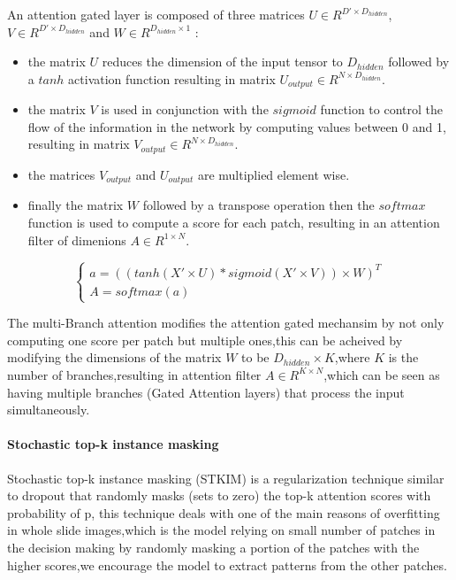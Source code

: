 \documentclass[
11pt, %
english, %
singlespacing, %
headsepline, %
]{project_structure}
\newcommand{\subpar}[1]{\paragraph*{#1}}
\begin{document}
\noindent An attention gated layer is composed of three matrices $U \in R^{D' \times D_{hidden}}$,$V \in R^{D' \times D_{hidden}} $ and $W \in R^{D_{hidden} \times 1}$ : 

\begin{itemize}
    \item the matrix $U$ reduces the dimension of the input tensor to $D_{hidden}$ followed by a $tanh$ activation function resulting in matrix $U_{output} \in R^{N \times D_{hidden}}$.
    \item the matrix $V$ is used in conjunction with the $sigmoid$ function to control the flow of the information in the network by computing values between 0 and 1, resulting in matrix $V_{output} \in R^{N \times D_{hidden}}$.
    \item the matrices $V_{output}$ and $U_{output}$ are multiplied element wise.
    \item finally the matrix $W$ followed by a transpose operation then the $softmax$ function is used to compute a score for each patch, resulting in an attention filter of dimenions $A \in R^{1 \times N}$.
\end{itemize}

$$
\begin{cases}
a = ((tanh(X' \times U) * sigmoid(X' \times V)) \times W)^T\\
A = softmax(a)
\end{cases}
$$


\noindent The multi-Branch attention modifies the attention gated mechansim by not only computing one score per patch but multiple ones,this can be acheived by modifying the dimensions of the matrix $W$ to be $D_{hidden} \times K$,where $K$ is the number of branches,resulting in  attention filter $A \in R^{K \times N}$,which can be seen as having multiple branches (Gated Attention layers) that process the input simultaneously.

\subpar{Stochastic top-k instance masking}

\noindent Stochastic top-k instance masking (\acrshort{STKIM}) is a regularization technique similar to dropout that randomly masks (sets to zero) the top-k attention scores with probability of p, this technique deals with one of the main reasons of overfitting in whole slide images,which is the model relying on small number of patches in the decision making by randomly masking a portion of the patches with the higher scores,we encourage the model to extract patterns from the other patches.\\
\end{document}
